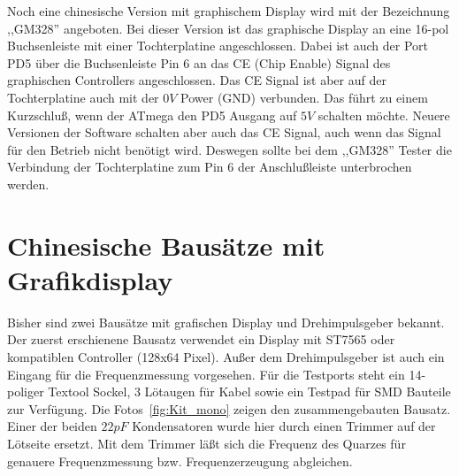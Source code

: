 Noch eine chinesische Version mit graphischem Display wird mit der Bezeichnung ,,GM328'' angeboten.
Bei dieser Version ist das graphische Display an eine 16-pol Buchsenleiste mit einer Tochterplatine
angeschlossen.
Dabei ist auch der Port PD5 über die Buchsenleiste Pin 6 an das CE (Chip Enable) Signal
des graphischen Controllers angeschlossen. Das CE Signal ist aber auf der Tochterplatine auch mit der
\(0V\) Power (GND) verbunden.
Das führt zu einem Kurzschluß, wenn der ATmega den PD5 Ausgang auf \(5V\) schalten möchte.
Neuere Versionen der Software schalten aber auch das CE Signal, auch wenn das Signal für den Betrieb nicht
benötigt wird.
Deswegen sollte bei dem ,,GM328'' Tester die Verbindung der Tochterplatine zum Pin 6 
der Anschlußleiste unterbrochen werden.

\section{Chinesische Bausätze mit Grafikdisplay}

Bisher sind zwei Bausätze mit grafischen Display und Drehimpulsgeber bekannt.
Der zuerst erschienene Bausatz verwendet ein Display mit ST7565 oder kompatiblen Controller (128x64 Pixel).
Außer dem Drehimpulsgeber ist  auch ein Eingang für die Frequenzmessung vorgesehen.
Für die Testports steht ein 14-poliger Textool Sockel, 3 Lötaugen für Kabel sowie ein Testpad
für SMD Bauteile zur Verfügung. 
Die Fotos~\ref{fig:Kit_mono} zeigen den zusammengebauten Bausatz.
Einer der beiden \(22 pF\) Kondensatoren 
wurde hier durch einen Trimmer auf der Lötseite ersetzt. Mit dem Trimmer läßt sich die Frequenz des Quarzes für genauere
Frequenzmessung bzw. Frequenzerzeugung abgleichen.

